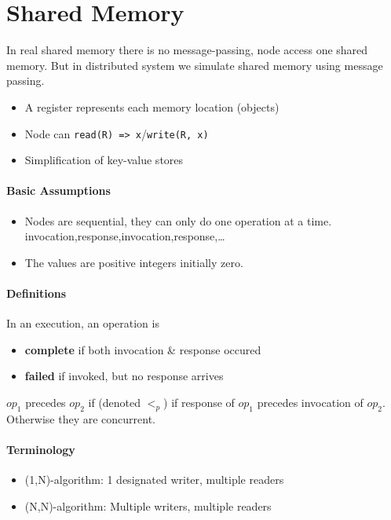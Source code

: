 \section{Shared Memory}

In real shared memory there is no message-passing, node access one
shared memory. But in distributed system we simulate shared memory
using message passing.

\begin{itemize}
	\item A register represents each memory location (objects)
    \item Node can \texttt{read(R) => x}/\texttt{write(R, x)}
	\item Simplification of key-value stores
\end{itemize}

\paragraph{Basic Assumptions}
\begin{itemize}
    \item Nodes are sequential, they can only do one operation at a time.
invocation,response,invocation,response,\ldots
\item The values are positive integers initially zero.
    \end{itemize}

\paragraph{Definitions}
In an execution, an operation is
\begin{itemize}
	\item \textbf{complete} if both invocation \& response occured
	\item \textbf{failed} if invoked, but no response arrives
\end{itemize}

$op_1$ precedes $op_2$ if (denoted $<_p$) if response of $op_1$
precedes invocation of $op_2$. Otherwise they are concurrent.

\paragraph{Terminology}
\begin{itemize}
	\item (1,N)-algorithm: 1 designated writer, multiple readers
	\item (N,N)-algorithm: Multiple writers, multiple readers
\end{itemize}


